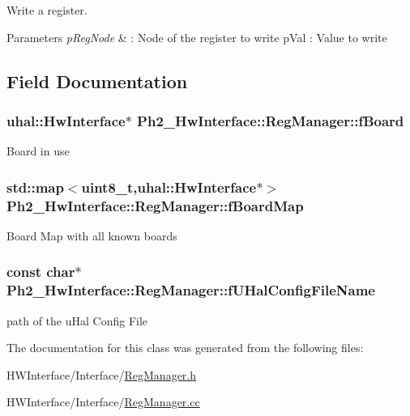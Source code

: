 Write a register. 


\begin{DoxyParams}{Parameters}
{\em p\-Reg\-Node} & \-: Node of the register to write p\-Val \-: Value to write \\
\hline
\end{DoxyParams}


\subsection{Field Documentation}
\hypertarget{class_ph2___hw_interface_1_1_reg_manager_a0d4908ec834a3a0b7d8139872fd0a4a0}{
\subsubsection[{f\-Board}]{\setlength{\rightskip}{0pt plus 5cm}uhal\-::\-Hw\-Interface$\ast$ Ph2\-\_\-\-Hw\-Interface\-::\-Reg\-Manager\-::f\-Board\hspace{0.3cm}{\ttfamily [protected]}}}\label{class_ph2___hw_interface_1_1_reg_manager_a0d4908ec834a3a0b7d8139872fd0a4a0}
Board in use \hypertarget{class_ph2___hw_interface_1_1_reg_manager_a9c34ffe467a572796c05036533bb6d39}{
\subsubsection[{f\-Board\-Map}]{\setlength{\rightskip}{0pt plus 5cm}std\-::map$<$uint8\-\_\-t,uhal\-::\-Hw\-Interface$\ast$$>$ Ph2\-\_\-\-Hw\-Interface\-::\-Reg\-Manager\-::f\-Board\-Map\hspace{0.3cm}{\ttfamily [protected]}}}\label{class_ph2___hw_interface_1_1_reg_manager_a9c34ffe467a572796c05036533bb6d39}
Board Map with all known boards \hypertarget{class_ph2___hw_interface_1_1_reg_manager_aaaa29ca65c283acc645132c7bef0f24f}{
\subsubsection[{f\-U\-Hal\-Config\-File\-Name}]{\setlength{\rightskip}{0pt plus 5cm}const char$\ast$ Ph2\-\_\-\-Hw\-Interface\-::\-Reg\-Manager\-::f\-U\-Hal\-Config\-File\-Name\hspace{0.3cm}{\ttfamily [protected]}}}\label{class_ph2___hw_interface_1_1_reg_manager_aaaa29ca65c283acc645132c7bef0f24f}
path of the u\-Hal Config File 

The documentation for this class was generated from the following files\-:\begin{DoxyCompactItemize}
\item 
H\-W\-Interface/\-Interface/\hyperlink{_reg_manager_8h}{Reg\-Manager.\-h}\item 
H\-W\-Interface/\-Interface/\hyperlink{_reg_manager_8cc}{Reg\-Manager.\-cc}\end{DoxyCompactItemize}

